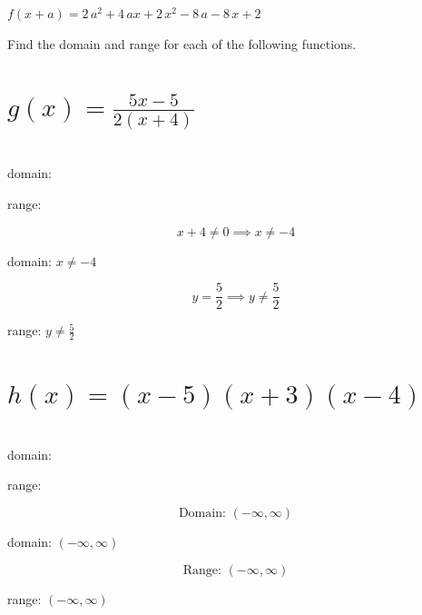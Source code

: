 \documentclass[11pt]{exam}
\begin{document}
\begin{questions}
\begin{parts}
\begin{solution}
\(\boxed{f(x + a) = 2 \, a^{2} + 4 \, a x + 2 \, x^{2} - 8 \, a - 8 \, x + 2}\)
            \end{solution}
    \end{parts}
\newpage

\question
Find the domain and range for each of the following functions.\\
\begin{parts}
    \part[4\half]{\(\displaystyle{ g(x) = \displaystyle \frac{5x - 5}{2(x + 4)} }\)}\\
    
         domain: \fillin[][2in]\\\vspace{12pt}
        
         range: \fillin[][2in]\\
\begin{solution}
\[x + 4 \neq 0 \implies x \neq -4\]

domain: \(\boxed{ x \neq -4 }\)

\[y = \frac{5}{2} \implies y \neq \frac{5}{2}\]

range: \(\boxed{ y \neq \frac{5}{2} }\)
\end{solution}
    \part[4\half]{\(\displaystyle{ h(x) = (x - 5)(x + 3)(x - 4) }\)}\\ 
    
         domain: \fillin[][2in]\\\vspace{12pt}
        
         range: \fillin[][2in]\\
\begin{solution}
\[\text{Domain: } (-\infty, \infty)\]

domain: \(\boxed{ (-\infty, \infty) }\)

\[\text{Range: } (-\infty, \infty)\]

range: \(\boxed{ (-\infty, \infty) }\)
\end{solution}


\end{parts}
\end{questions}
\end{document}
